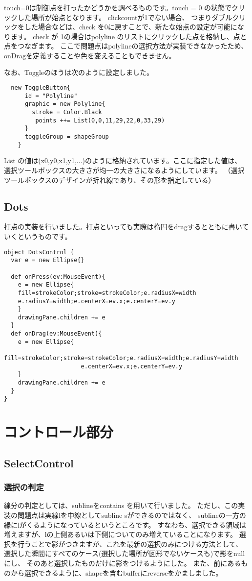 \documentclass [11pt] {jsarticle}
\begin{document}
touch=0は制御点を打ったかどうかを調べるものです。touch = 0 の状態でクリックした場所が始点となります。
clickcountが1でない場合、
つまりダブルクリックをした場合などは、check を0に戻すことで、新たな始点の設定が可能になります。
check が 1の場合はpolyline のリストにクリックした点を格納し、点と点をつなぎます。
ここで問題点はpolylineの選択方法が実装できなかったため、
onDragを定義することや色を変えることもできません。

なお、Toggleのほうは次のように設定しました。

\begin{verbatim}
  new ToggleButton{
      id = "Polyline"
      graphic = new Polyline{
        stroke = Color.Black
         points ++= List(0,0,11,29,22,0,33,29)
      }
      toggleGroup = shapeGroup
    }
\end{verbatim}

List の値は(x0,y0,x1,y1,...)のように格納されています。ここに指定した値は、
選択ツールボックスの大きさが均一の大きさになるようにしています。
（選択ツールボックスのデザインが折れ線であり、その形を指定している）

\subsection{Dots}
打点の実装を行いました。打点といっても実際は楕円をdragするとともに書いていくというものです。
\begin{verbatim}
object DotsControl {
  var e = new Ellipse{}

  def onPress(ev:MouseEvent){
    e = new Ellipse{
    fill=strokeColor;stroke=strokeColor;e.radiusX=width
    e.radiusY=width;e.centerX=ev.x;e.centerY=ev.y
    }
    drawingPane.children += e
  }
  def onDrag(ev:MouseEvent){
    e = new Ellipse{
      fill=strokeColor;stroke=strokeColor;e.radiusX=width;e.radiusY=width
                      e.centerX=ev.x;e.centerY=ev.y
    }
    drawingPane.children += e
  }
}
\end{verbatim}

\section {コントロール部分}
\subsection{SelectControl}
\subsubsection{選択の判定}
線分の判定としては、sublineをcontains を用いて行いました。
ただし、この実装の問題点は実線lを中線としてsubline sができるのではなく、
sublineの一方の縁にlがくるようになっているというところです。
すなわち、選択できる領域は増えますが、lの上側あるいは下側についてのみ増えていることになります。
選択を行うことで影がつきますが、これを最新の選択のみにつける方法として、
選択した瞬間にすべてのケース(選択した場所が図形でないケースも)で影をnullにし、
そのあと選択したものだけに影をつけるようにした。
また、前にあるものから選択できるように、shapeを含むbufferにreverseをかましました。
\end{document}
